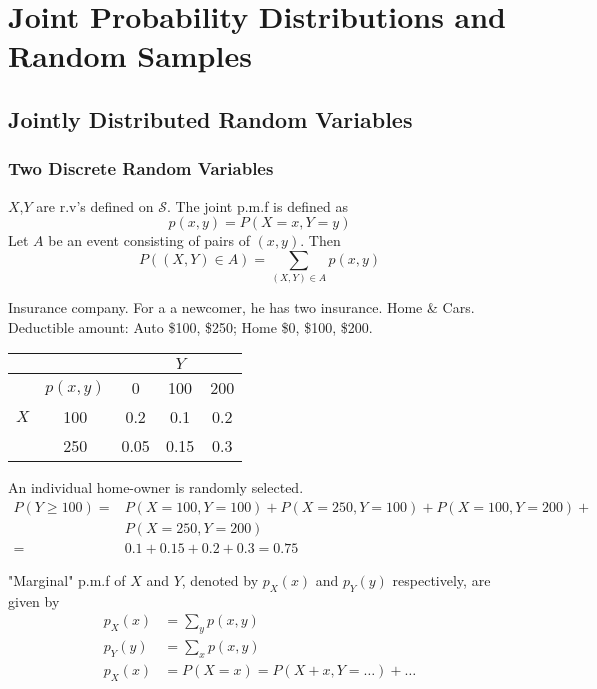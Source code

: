 \chapter{Joint Probability Distributions and Random Samples}
\section{Jointly Distributed Random Variables}
\subsection{Two Discrete Random Variables}
$X$,$Y$ are r.v's defined on $\mathcal{S}$. The joint p.m.f is defined as 
\[p(x,y)=P(X=x,Y=y)\]
Let $A$ be an event consisting of pairs of $(x,y)$. Then
\[P\left((X,Y)\in A\right) = \sum_{(X,Y)\in A}p(x,y)\]

\begin{exmp}
Insurance company. For a a newcomer, he has two insurance. Home \& Cars. Deductible amount: Auto \$100, \$250; Home \$0, \$100, \$200.
\begin{center}
\begin{tabular}{|c|c|ccc|}
\hline
    &     &    & $Y$ &   \\
\hline
    & $p(x,y)$ & 0    & 100  & 200  \\
$X$ & 100      & 0.2  & 0.1  & 0.2  \\
    & 250      & 0.05 & 0.15 & 0.3  \\
\hline
\end{tabular}
\end{center}
An individual home-owner is randomly selected.
\begin{align*}
P(Y \geq 100)=& P(X=100, Y=100)+P(X=250, Y=100)+P(X=100, Y=200)+\\
&P(X=250, Y=200)\\
=& 0.1+0.15+0.2+0.3=0.75
\end{align*}
\end{exmp}

\begin{defn}
"Marginal" p.m.f of $X$ and $Y$, denoted by $p_X(x)$ and $p_Y(y)$ respectively, are given by
\begin{align*}
p_X(x)&=\sum_{y}p(x,y)	\\
p_Y(y)&=\sum_{x}p(x,y)	\\
p_X(x)&=P(X=x)=P(X+x,Y=\dots)+\dots
\end{align*}
\end{defn}

